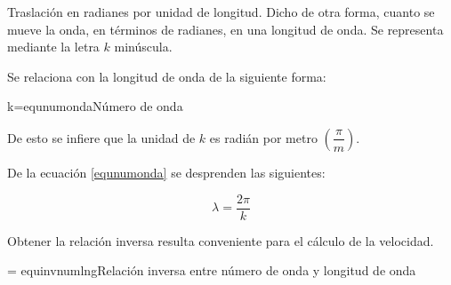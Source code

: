Traslación en radianes por unidad de longitud. Dicho de otra forma, cuanto se mueve la onda, en términos de radianes, en una longitud de onda. Se representa mediante la letra $k$ minúscula.

Se relaciona con la longitud de onda de la siguiente forma:

\begin{listequbox}
  {k=\dfrac{2\pi}{\lambda}}{equnumonda}{Número de onda}
\end{listequbox}

De esto se infiere que la unidad de $k$ es radián por metro $\left(\dfrac{\pi}{m}\right)$.

De la ecuación \ref{equnumonda} se desprenden las siguientes:

\[\boxed{
  \lambda = \dfrac{2\pi}{k}
}\]

Obtener la relación inversa resulta conveniente para el cálculo de la velocidad.

\begin{listequbox}
  { = \dfrac{\lambda}{2\pi}}{equinvnumlng}{Relación inversa entre número de onda y longitud de onda}
\end{listequbox}
